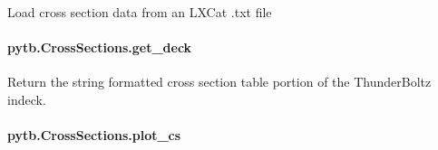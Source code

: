 \documentclass[letterpaper,10pt,english,openany,oneside]{sphinxmanual}
\begin{document}
\begin{fulllineitems}
\begin{fulllineitems}
\label{\detokenize{api/pytb.CrossSections.from_LXCat:pytb.CrossSections.from_LXCat}}
\pysigstartsignatures
{}
\pysigstopsignatures
\sphinxAtStartPar
Load cross section data from an LXCat .txt file

\end{fulllineitems}


\sphinxstepscope


\paragraph{pytb.CrossSections.get\_deck}
\label{\detokenize{api/pytb.CrossSections.get_deck:pytb-crosssections-get-deck}}\label{\detokenize{api/pytb.CrossSections.get_deck::doc}}

\begin{fulllineitems}
\label{\detokenize{api/pytb.CrossSections.get_deck:pytb.CrossSections.get_deck}}
\pysigstartsignatures
{}
\pysigstopsignatures
\sphinxAtStartPar
Return the string formatted cross section table portion of the
ThunderBoltz indeck.

\end{fulllineitems}


\sphinxstepscope


\paragraph{pytb.CrossSections.plot\_cs}
\label{\detokenize{api/pytb.CrossSections.plot_cs:pytb-crosssections-plot-cs}}\label{\detokenize{api/pytb.CrossSections.plot_cs::doc}}


\end{fulllineitems}
\end{document}
